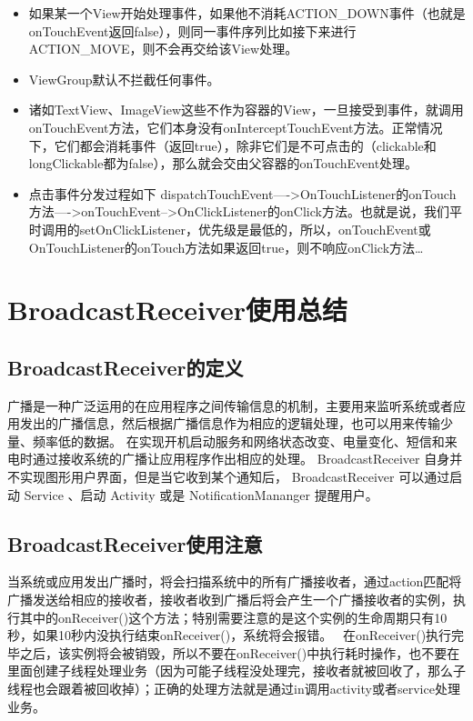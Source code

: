 \documentclass[9pt, b5paper]{article}
\begin{document}
\begin{itemize}
\item 如果某一个View开始处理事件，如果他不消耗ACTION\_DOWN事件（也就是onTouchEvent返回false），则同一事件序列比如接下来进行ACTION\_MOVE，则不会再交给该View处理。

\item ViewGroup默认不拦截任何事件。　

\item 诸如TextView、ImageView这些不作为容器的View，一旦接受到事件，就调用onTouchEvent方法，它们本身没有onInterceptTouchEvent方法。正常情况下，它们都会消耗事件（返回true），除非它们是不可点击的（clickable和longClickable都为false），那么就会交由父容器的onTouchEvent处理。　

\item 点击事件分发过程如下 dispatchTouchEvent—->OnTouchListener的onTouch方法—->onTouchEvent-->OnClickListener的onClick方法。也就是说，我们平时调用的setOnClickListener，优先级是最低的，所以，onTouchEvent或OnTouchListener的onTouch方法如果返回true，则不响应onClick方法\ldots{}
\end{itemize}

\section{BroadcastReceiver使用总结}
\label{sec-13}
\subsection{BroadcastReceiver的定义}
\label{sec-13-1}
广播是一种广泛运用的在应用程序之间传输信息的机制，主要用来监听系统或者应用发出的广播信息，然后根据广播信息作为相应的逻辑处理，也可以用来传输少量、频率低的数据。
在实现开机启动服务和网络状态改变、电量变化、短信和来电时通过接收系统的广播让应用程序作出相应的处理。
BroadcastReceiver 自身并不实现图形用户界面，但是当它收到某个通知后， BroadcastReceiver 可以通过启动 Service 、启动 Activity 或是 NotificationMananger 提醒用户。
\subsection{BroadcastReceiver使用注意}
\label{sec-13-2}
当系统或应用发出广播时，将会扫描系统中的所有广播接收者，通过action匹配将广播发送给相应的接收者，接收者收到广播后将会产生一个广播接收者的实例，执行其中的onReceiver()这个方法；特别需要注意的是这个实例的生命周期只有10秒，如果10秒内没执行结束onReceiver()，系统将会报错。　
在onReceiver()执行完毕之后，该实例将会被销毁，所以不要在onReceiver()中执行耗时操作，也不要在里面创建子线程处理业务（因为可能子线程没处理完，接收者就被回收了，那么子线程也会跟着被回收掉）；正确的处理方法就是通过in调用activity或者service处理业务。
\end{document}
